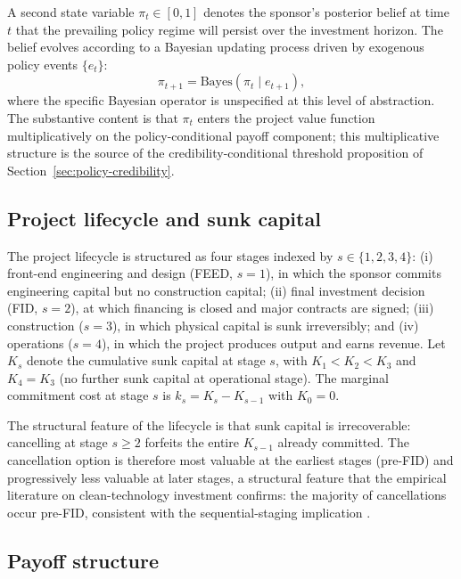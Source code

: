 \documentclass[12pt,a4paper]{article}
\theoremstyle{plain}
\theoremstyle{definition}
\begin{document}
A second state variable $\pi_t \in [0, 1]$ denotes the sponsor's posterior belief at time $t$ that the prevailing policy regime will persist over the investment horizon. The belief evolves according to a Bayesian updating process driven by exogenous policy events $\{e_t\}$:
\begin{equation}
\pi_{t+1} = \mathrm{Bayes}(\pi_t \mid e_{t+1}),
\label{eq:credibility-update}
\end{equation}
where the specific Bayesian operator is unspecified at this level of abstraction. The substantive content is that $\pi_t$ enters the project value function multiplicatively on the policy-conditional payoff component; this multiplicative structure is the source of the credibility-conditional threshold proposition of Section~\ref{sec:policy-credibility}.

\subsection{Project lifecycle and sunk capital}
\label{sec:model-staging}

The project lifecycle is structured as four stages indexed by $s \in \{1, 2, 3, 4\}$: (i) front-end engineering and design (FEED, $s = 1$), in which the sponsor commits engineering capital but no construction capital; (ii) final investment decision (FID, $s = 2$), at which financing is closed and major contracts are signed; (iii) construction ($s = 3$), in which physical capital is sunk irreversibly; and (iv) operations ($s = 4$), in which the project produces output and earns revenue. Let $K_s$ denote the cumulative sunk capital at stage $s$, with $K_1 < K_2 < K_3$ and $K_4 = K_3$ (no further sunk capital at operational stage). The marginal commitment cost at stage $s$ is $k_s = K_s - K_{s-1}$ with $K_0 = 0$.

The structural feature of the lifecycle is that sunk capital is irrecoverable: cancelling at stage $s \geq 2$ forfeits the entire $K_{s-1}$ already committed. The cancellation option is therefore most valuable at the earliest stages (pre-FID) and progressively less valuable at later stages, a structural feature that the empirical literature on clean-technology investment confirms: the majority of cancellations occur pre-FID, consistent with the sequential-staging implication \citep{saakstra2026thesis}.

\subsection{Payoff structure}
\label{sec:model-payoff}
\end{document}
